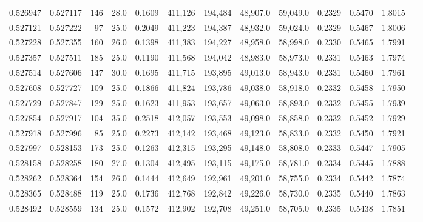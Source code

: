 \begin{tabular}{rrrrrrrrrrrrr}
0.526947 & 0.527117 &   146 & 28.0 &                                     0.1609 & 411,126 & 194,484 &  48,907.0 &  59,049.0 & 0.2329 & 0.5470 & 1.8015 \\
0.527121 & 0.527222 &    97 & 25.0 &                                     0.2049 & 411,223 & 194,387 &  48,932.0 &  59,024.0 & 0.2329 & 0.5467 & 1.8006 \\
0.527228 & 0.527355 &   160 & 26.0 &                                     0.1398 & 411,383 & 194,227 &  48,958.0 &  58,998.0 & 0.2330 & 0.5465 & 1.7991 \\
0.527357 & 0.527511 &   185 & 25.0 &                                     0.1190 & 411,568 & 194,042 &  48,983.0 &  58,973.0 & 0.2331 & 0.5463 & 1.7974 \\
0.527514 & 0.527606 &   147 & 30.0 &                                     0.1695 & 411,715 & 193,895 &  49,013.0 &  58,943.0 & 0.2331 & 0.5460 & 1.7961 \\
0.527608 & 0.527727 &   109 & 25.0 &                                     0.1866 & 411,824 & 193,786 &  49,038.0 &  58,918.0 & 0.2332 & 0.5458 & 1.7950 \\
0.527729 & 0.527847 &   129 & 25.0 &                                     0.1623 & 411,953 & 193,657 &  49,063.0 &  58,893.0 & 0.2332 & 0.5455 & 1.7939 \\
0.527854 & 0.527917 &   104 & 35.0 &                                     0.2518 & 412,057 & 193,553 &  49,098.0 &  58,858.0 & 0.2332 & 0.5452 & 1.7929 \\
0.527918 & 0.527996 &    85 & 25.0 &                                     0.2273 & 412,142 & 193,468 &  49,123.0 &  58,833.0 & 0.2332 & 0.5450 & 1.7921 \\
0.527997 & 0.528153 &   173 & 25.0 &                                     0.1263 & 412,315 & 193,295 &  49,148.0 &  58,808.0 & 0.2333 & 0.5447 & 1.7905 \\
0.528158 & 0.528258 &   180 & 27.0 &                                     0.1304 & 412,495 & 193,115 &  49,175.0 &  58,781.0 & 0.2334 & 0.5445 & 1.7888 \\
0.528262 & 0.528364 &   154 & 26.0 &                                     0.1444 & 412,649 & 192,961 &  49,201.0 &  58,755.0 & 0.2334 & 0.5442 & 1.7874 \\
0.528365 & 0.528488 &   119 & 25.0 &                                     0.1736 & 412,768 & 192,842 &  49,226.0 &  58,730.0 & 0.2335 & 0.5440 & 1.7863 \\
0.528492 & 0.528559 &   134 & 25.0 &                                     0.1572 & 412,902 & 192,708 &  49,251.0 &  58,705.0 & 0.2335 & 0.5438 & 1.7851 \\

\end{tabular}
